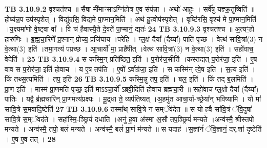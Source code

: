 \documentclass[17pt]{extarticle}
\begin{document}
{{{{{{{{{{{{{{{{{{{{{{                  \newline
                                \textbf{ TB 3.10.9.2} \newline
                  वृ॒श्चत॑श्च ॥ सैषा मी॑माꣳ॒॒साऽग्नि॑हो॒त्र ए॒व स॑पंन्ना । अथो॑ आहुः । सर्वे॑षु यज्ञ्क्र॒तुष्विति॑ ॥ होष्य॑न्न॒प उप॑स्पृशेत् । विद्यु॑दसि॒ विद्य॑मे पा॒प्मान॒मिति॑ । अथ॑ हु॒त्वोप॑स्पृशेत् । वृष्टि॑रसि॒ वृश्च॑ मे पा॒प्मान॒मिति॑ ।य॒क्ष्यमा॑णो वे॒ष्ट्वा वा᳚ । वि च॑ है॒वास्यै॒ते दे॒वते॑ पा॒प्मानं॒ द्यतः॑ \textbf{ 24} \newline
                  \newline
                                \textbf{ TB 3.10.9.3} \newline
                  वृ॒श्चत॑श्च ॥ अ॒त्यꣳ॒॒हो हारु॑णिः । ब्र॒ह्म॒चा॒रिणे᳚ प्र॒श्नान् प्रोच्य॒ प्रजि॑घाय ।परे॑हि । प्ल॒क्षं दैयां᳚ (दैय्यां᳚) पातिं पृच्छ । वेत्थ॑ सावि॒त्रां(3) न वे॒त्था(3) इति॑ ।तमा॒गत्य॑ पप्रच्छ । आ॒चार्यो॑ मा॒ प्राहै॑षीत् ।वेत्थ॑ सावि॒त्रां(3) न वे॒त्था(3) इति॑ । सहो॑वाच॒ वेदेति॑ । \textbf{ 25} \newline
                  \newline
                                \textbf{ TB 3.10.9.4} \newline
                  स कस्मि॒न् प्रति॑ष्ठित॒ इति॑ । प॒रोर॑ज॒सीति॑ ।कस्तद्यत् प॒रोर॑जा॒ इति॑ । ए॒ष वाव स प॒रोर॑जा॒ इति॑ होवाच । य ए॒ष तप॑ति । ए॒षो᳚ ऽर्वाग्र॑जा॒ इति॑ । स कस्मि॑न् त्वे॒ष इति॑ । स॒त्य इति॑ । किं तथ्स॒त्यमिति॑ । तप॒ इति॑ \textbf{ 26} \newline
                  \newline
                                \textbf{ TB 3.10.9.5} \newline
                  कस्मि॒न्नु तप॒ इति॑ । बल॒ इति॑ । किं तद् ब॒लमिति॑ । प्रा॒ण इति॑ । मास्म॑ प्रा॒णमति॑ पृच्छ॒ इति॑ माऽऽचा॒र्यो᳚ ऽब्रवी॒दिति॑ होवाच ब्रह्मचा॒री ॥ सहो॑वाच प्ल॒क्षो दैयां᳚ (दैय्यां᳚) पातिः । यद्वै ब्र॑ह्मचारिन् प्रा॒णमत्य॑प्रक्ष्यः । मू॒द्र्धा ते॒ व्यप॑तिष्यत् ।अ॒हमु॑त आचा॒र्या-च्छ्रेया᳚न् भविष्यामि । यो मा॑ सावि॒त्रे स॒मवा॑दि॒ष्टेति॑ \textbf{ 27} \newline
                  \newline
                                \textbf{ TB 3.10.9.6} \newline
                  तस्मा᳚थ् सावि॒त्रे न सम्ॅव॑देत ॥ स यो ह॒वै सा॑वि॒त्रं ॅवि॒दुषा॑ सावि॒त्रे स॒म्ॅवद॑ते । सहा᳚स्मि॒-ञ्छ्रियं॑ दधाति ।अनु॑ ह॒वा अ॑स्मा अ॒सौ तप॒ञ्छ्रियं॑ मन्यते ।अन्व॑स्मै॒ श्रीस्तपो॑ मन्यते । अन्व॑स्मै॒ तपो॒ बलं॑ मन्यते । अन्व॑स्मै॒ बलं॑ प्रा॒णं म॑न्यते ॥ स यदाह॑ ।स॒ज्ञांनं॑ ॅवि॒ज्ञानं॒ दर्.शा॑ दृ॒ष्टेति॑ । ए॒ष ए॒व तत् । \textbf{ 28} \newline
}}}}}}}}}}}}}}}}}}}}}}
\end{document}
